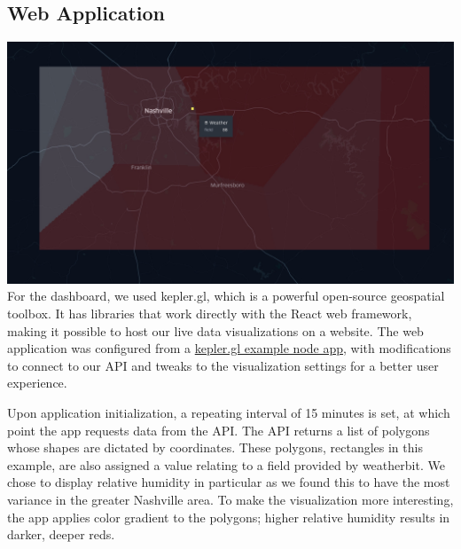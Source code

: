 \subsection{Web Application}
\includegraphics[width=\linewidth]{figures/dashboard.jpg}
For the dashboard, we used kepler.gl, which is a powerful open-source geospatial toolbox. It has libraries that work directly with the React web framework, making it possible to host our live data visualizations on a website. 
\cite{kepler}
The web application was configured from a \href{https://github.com/keplergl/kepler.gl/tree/master/examples/node-app}{kepler.gl example node app},
with modifications to connect to our API and tweaks to the visualization settings for a better user experience. 

Upon application initialization, a repeating interval of 15 minutes is set, at which point the app requests data from the API. The API returns a list of polygons whose shapes are dictated by coordinates. These polygons, rectangles in this example, are also assigned a value relating to a field provided by weatherbit. We chose to display relative humidity in particular as we found this to have the most variance in the greater Nashville area. To make the visualization more interesting, the app applies color gradient to the polygons; higher relative humidity results in darker, deeper reds.